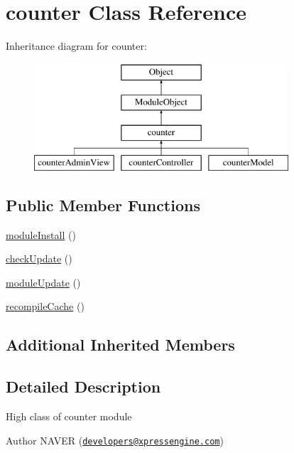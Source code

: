 \hypertarget{classcounter}{\section{counter Class Reference}
\label{classcounter}
}
Inheritance diagram for counter\-:\begin{figure}[H]
\begin{center}
\leavevmode
\includegraphics[height=4.000000cm]{classcounter}
\end{center}
\end{figure}
\subsection*{Public Member Functions}
\begin{DoxyCompactItemize}
\item 
\hyperlink{classcounter_a05510fe21e12390a3cdee668b42cab5b}{module\-Install} ()
\item 
\hyperlink{classcounter_a41683d96129e79d63ce63ccde0efa2f0}{check\-Update} ()
\item 
\hyperlink{classcounter_a7c2e176fb177033a303aca925cddb046}{module\-Update} ()
\item 
\hyperlink{classcounter_a44bf39e02c7cb7c4a3c3000f9b8fba27}{recompile\-Cache} ()
\end{DoxyCompactItemize}
\subsection*{Additional Inherited Members}


\subsection{Detailed Description}
High class of counter module

\begin{DoxyAuthor}{Author}
N\-A\-V\-E\-R (\href{mailto:developers@xpressengine.com}{\tt developers@xpressengine.\-com}) 
\end{DoxyAuthor}


